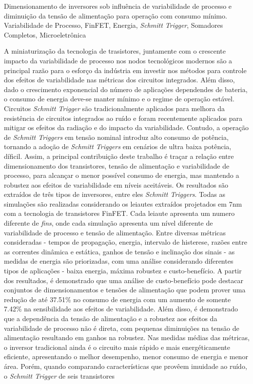 \documentclass[pgmicro,diss,english]{iiufrgs}
\begin{document}

\begin{englishabstract}
{
Dimensionamento de inversores sob influência de variabilidade de processo e diminuição da  tensão de alimentação para operação com consumo mínimo.
}{Variabilidade de Processo, FinFET, Energia, \textit{Schmitt Trigger}, Somadores Completos, Microeletrônica}
{

A miniaturização da tecnologia de trasistores, juntamente com o crescente impacto da variabilidade de processo nos nodos tecnológicos modernos são a principal razão para o esforço da indústria em investir nos métodos para controle dos efeitos de variabilidade nas métricas dos circuitos integrados. Além disso, dado o crescimento exponencial do número de aplicações dependendes de bateria, o consumo de energia deve-se manter mínimo e o regime de operação estável. Circuitos \textit{Schmitt Trigger} são tradicionalmente aplicados para melhora da resistência de circuitos integrados ao ruído e foram recentemente aplicados para mitigar os efeitos da radiação e do impacto da variabilidade. Contudo, a operação de \textit{Schmitt Triggers} em tensão nominal introduz alto consumo de potência, tornando a adoção de \textit{Schmitt Triggers} em cenários de ultra baixa potência, díficil. Assim, a principal contribuição deste trabalho é traçar a relação entre dimensionamento dos transistores, tensão de alimentação e variabilidade de processo, para alcançar o menor possível consumo de energia, mas mantendo a robustez aos efeitos de variabilidade em níveis aceitáveis. Os resultados são extraídos de três tipos de inversores, entre eles \textit{Schmitt Triggers}. Todas as simulações são realizadas considerando os leiautes extraídos projetados em 7nm com a tecnologia de transistores FinFET. Cada leiaute apresenta um numero diferente de \textit{fins}, onde cada simulação apresenta um nível diferente de variabilidade de processo e tensão de alimentação. Entre diversas métricas consideradas - tempos de propagação, energia, intervalo de histerese, razões entre as correntes dinâmica e estática, ganhos de tensão e inclinação dos sinais - as medidas de energia são priorizadas, com uma análise considerando diferentes tipos de aplicações - baixa energia, máxima robustez e custo-benefício. A partir dos resultados, é demonstrado que uma análise de custo-benefício pode destacar conjuntos de dimensionamentos e tensões de alimentação que podem prover uma redução de até 37.51\% no consumo de energia com um aumento de somente 7.42\% na sensibilidade aos efeitos de variabilidade. Além disso, é demonstrado que a dependência da tensão de alimentação e a robustez aos efeitos da variabilidade de processo não é direta, com pequenas diminuições na tensão de alimentação resultando em ganhos na robustez. Nas medidas médias das métricas, o inversor tradicional ainda é o circuito mais rápido e mais energéticamente eficiente, apresentando o melhor desempenho,  menor consumo de energia e menor área. Porém, quando comparando características que provêem imuidade ao ruído, o \textit{Schmitt Trigger} de seis transistores }
\end{englishabstract}
\end{document}
